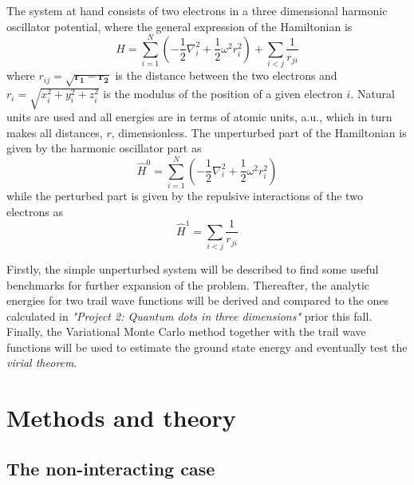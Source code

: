 \documentclass[12pt,english,a4paper]{article}
\begin{document}
The system at hand consists of two electrons in a three dimensional harmonic oscillator potential, where the general expression of the Hamiltonian is
\begin{equation}
    \hat H = \sum_{i=1}^N \left(-\frac{1}{2}\nabla_i^2 +\frac{1}{2}\omega^2r_i^2\right)+\sum_{i<j}\frac{1}{r_{ji}}
    \label{eq:hamiltonian_total}
\end{equation}
where $r_{ij}=\sqrt{\boldsymbol{r_1}-\boldsymbol{r_2}}$ is the distance between the two electrons and $r_i=\sqrt{x_i^2+y_i^2+z_i^2}$ is the modulus of the position of a given electron $i$. Natural units are used and all energies are in terms of atomic units, a.u., which in turn makes all distances, $r$, dimensionless. The unperturbed part of the Hamiltonian is given by the harmonic oscillator part as
\begin{equation}
    \hat H^0 = \sum_{i=1}^N \left(-\frac{1}{2}\nabla_i^2 +\frac{1}{2}\omega^2r_i^2\right)
    \label{eq:hamiltonian_unperturbed}
\end{equation}
while the perturbed part is given by the repulsive interactions of the two electrons as
\begin{equation}
    \hat H^1 = \sum_{i<j}\frac{1}{r_{ji}}
    \label{eq:hamiltonian_perturbed}
\end{equation}

Firstly, the simple unperturbed system will be described to find some useful benchmarks for further expansion of the problem. Thereafter, the analytic energies for two trail wave functions will be derived and compared to the ones calculated in \textit{"Project 2: Quantum dots in three dimensions"} \cite{GitHub} prior this fall. Finally, the Variational Monte Carlo method together with the trail wave functions will be used to estimate the ground state energy and eventually test the \textit{virial theorem}. 

\newpage

\section{Methods and theory} \label{section:theory}
\subsection{The non-interacting case} \label{section:theory:non-interacting}
\end{document}

